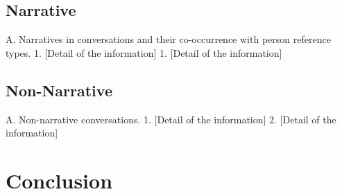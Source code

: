 \documentclass[12pt]{turabian-researchpaper}
\begin{document}
\subsection{Narrative}
A.	Narratives in conversations and their co-occurrence with person reference types.
1.	[Detail of the information]
1.	[Detail of the information]
\subsection{Non-Narrative}
A.	Non-narrative conversations. 
1.	[Detail of the information]
2.	[Detail of the information]

\section{Conclusion}

\printbibliography
\end{document}
